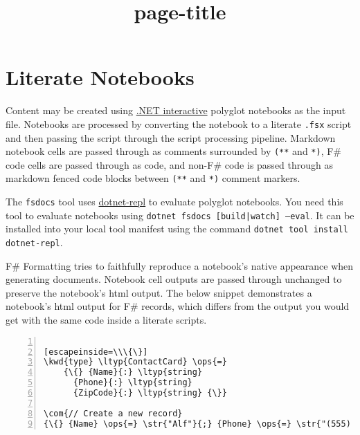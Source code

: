 \documentclass{article}
\title{{page-title}}
\date{}
\newcommand{\com}[1]{\textcolor{officegreen}{#1}}
\newcommand{\kwd}[1]{\textcolor{navy}{#1}}
\newcommand{\ops}[1]{\textcolor{purple}{#1}}
\newcommand{\str}[1]{\textcolor{olive}{#1}}
\begin{document}
\maketitle


\section*{Literate Notebooks}



Content may be created using  \href{https://github.com/dotnet/interactive/tree/main}{.NET interactive} polyglot notebooks as the input file. Notebooks are processed by converting the notebook to a literate \texttt{.fsx} script and then passing the script through the script processing pipeline. Markdown notebook cells are passed through as comments surrounded by \texttt{(**} and \texttt{*)}, F\# code cells are passed through as code, and non-F\# code is passed through as markdown fenced code blocks between \texttt{(**} and \texttt{*)} comment markers.


The \texttt{fsdocs} tool uses \href{https://github.com/jonsequitur/dotnet-repl}{dotnet-repl} to evaluate polyglot notebooks. You need this tool to evaluate notebooks using \texttt{dotnet fsdocs [build|watch] --eval}. It can be installed into your local tool manifest using the command \texttt{dotnet tool install dotnet-repl}.


F\# Formatting tries to faithfully reproduce a notebook's native appearance when generating documents. Notebook cell outputs are passed through unchanged to preserve the notebook's html output. The below snippet demonstrates a notebook's html output for F\# records, which differs from the output you would get with the same code inside a literate scripts.
\begin{lstlisting}[numbers=left]

[escapeinside=\\\{\}]
\kwd{type} \ltyp{ContactCard} \ops{=}
    {\{} {Name}{:} \ltyp{string}
      {Phone}{:} \ltyp{string}
      {ZipCode}{:} \ltyp{string} {\}}

\com{// Create a new record}
{\{} {Name} \ops{=} \str{"Alf"}{;} {Phone} \ops{=} \str{"(555) 555-5555"}{;} {ZipCode} \ops{=} \str{"90210"} {\}}

\end{lstlisting}
\end{document}
